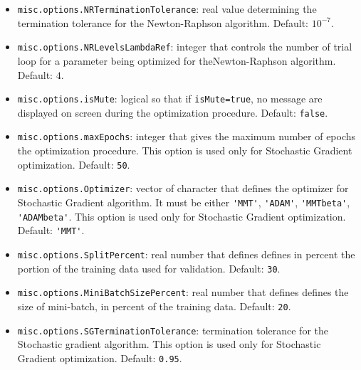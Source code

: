 \begin{itemize}
\begin{itemize}
\item \lstinline[basicstyle = \mlttfamily \small ]!misc.options.NRTerminationTolerance!: real value determining the termination tolerance for the Newton-Raphson algorithm. Default: $10^{-7}$.
\item \lstinline[basicstyle = \mlttfamily \small ]!misc.options.NRLevelsLambdaRef!: integer that controls the number of trial loop for a parameter being optimized for theNewton-Raphson algorithm. Default: $4$.
\item \lstinline[basicstyle = \mlttfamily \small ]!misc.options.isMute!: logical so that if \lstinline[basicstyle = \mlttfamily \small ]!isMute=true!, no message are displayed on screen during the optimization procedure. Default: \lstinline[basicstyle = \mlttfamily \small ]!false!.
\item \lstinline[basicstyle = \mlttfamily \small ]!misc.options.maxEpochs!: integer that gives the maximum number of epochs the optimization procedure. This option is used only for Stochastic Gradient optimization. Default: \lstinline[basicstyle = \mlttfamily \small ]!50!.
\item \lstinline[basicstyle = \mlttfamily \small ]!misc.options.Optimizer!: vector of character that defines the optimizer for Stochastic Gradient algorithm. It must be either \lstinline[basicstyle = \mlttfamily \small ]!'MMT'!, \lstinline[basicstyle = \mlttfamily \small ]!'ADAM'!, \lstinline[basicstyle = \mlttfamily \small ]!'MMTbeta'!, \lstinline[basicstyle = \mlttfamily \small ]!'ADAMbeta'!. This option is used only for Stochastic Gradient optimization. Default: \lstinline[basicstyle = \mlttfamily \small ]!'MMT'!.
\item \lstinline[basicstyle = \mlttfamily \small ]!misc.options.SplitPercent!: real number that defines defines in percent the portion of the training data used for validation. Default: \lstinline[basicstyle = \mlttfamily \small ]!30!.
\item \lstinline[basicstyle = \mlttfamily \small ]!misc.options.MiniBatchSizePercent!: real number that defines defines the size of mini-batch, in percent of the training data. Default: \lstinline[basicstyle = \mlttfamily \small ]!20!.
\item \lstinline[basicstyle = \mlttfamily \small ]!misc.options.SGTerminationTolerance!: termination tolerance for the Stochastic gradient algorithm. This option is used only for Stochastic Gradient optimization. Default: \lstinline[basicstyle = \mlttfamily \small ]!0.95!.
\end{itemize}


\end{itemize}
